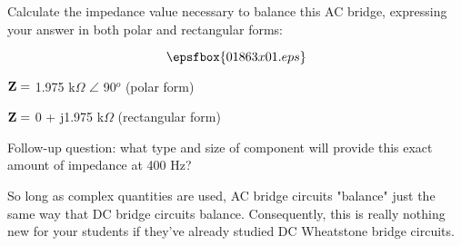 

Calculate the impedance value necessary to balance this AC bridge, expressing your answer in both polar and rectangular forms:

$$\epsfbox{01863x01.eps}$$







${\bf Z} =$ 1.975 k$\Omega$ $\angle$ 90$^{o}$ (polar form)

${\bf Z} =$ 0 + j1.975 k$\Omega$ (rectangular form)

\vskip 10pt

Follow-up question: what type and size of component will provide this exact amount of impedance at 400 Hz?







So long as complex quantities are used, AC bridge circuits "balance" just the same way that DC bridge circuits balance.  Consequently, this is really nothing new for your students if they've already studied DC Wheatstone bridge circuits.




